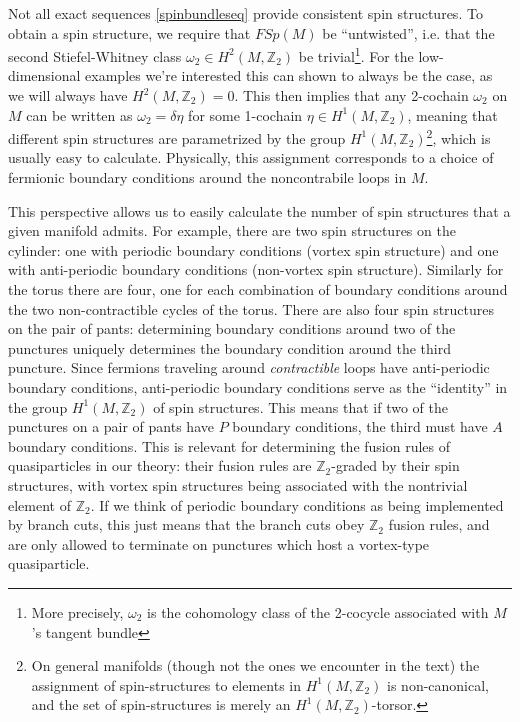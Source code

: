 \documentclass[12pt,a4paper]{article}
\newcommand{\zt}{\mathbb{Z}_2}
\begin{document}
Not all exact sequences \eqref{spinbundleseq} provide consistent spin structures. To obtain a spin structure, we require that $FSp(M)$ be ``untwisted'', i.e. 
that the second Stiefel-Whitney class $\omega_2 \in H^2(M,\zt)$ be trivial\footnote{More precisely, $\omega_2$ is the cohomology class of the 2-cocycle associated with $M$'s tangent bundle}. For the low-dimensional examples we're interested this can shown to always be the case, as we will always have $H^2(M,\zt) = 0$. This then implies that any 2-cochain $\omega_2$ on $M$ can be written as $\omega_2 = \delta \eta$ for some 1-cochain $\eta \in H^1(M,\zt)$, meaning that different spin structures are parametrized by the group $H^1(M,\zt)$\footnote{On general manifolds (though not the ones we encounter in the text) the assignment of spin-structures to elements in $H^1(M,\zt)$ is non-canonical, and the set of spin-structures is merely an $H^1(M,\zt)$-torsor.}, which is usually easy to calculate. Physically, this assignment corresponds to a choice of fermionic boundary conditions around the noncontrabile loops in $M$. 

This perspective allows us to easily calculate the number of spin structures that a given manifold admits. For example, there are two spin structures on the cylinder: one with periodic boundary conditions (vortex spin structure) and one with anti-periodic boundary conditions (non-vortex spin structure). Similarly for the torus there are four, one for each combination of boundary conditions around the two non-contractible cycles of the torus. There are also four spin structures on the pair of pants: determining boundary conditions around two of the punctures uniquely determines the boundary condition around the third puncture. Since fermions traveling around {\it contractible} loops have anti-periodic boundary conditions, anti-periodic boundary conditions serve as the ``identity'' in the group $H^1(M,\zt)$ of spin structures. This means that if two of the punctures on a pair of pants have $P$ boundary conditions, the third must have $A$ boundary conditions. This is relevant for determining the fusion rules of quasiparticles in our theory: their fusion rules are $\zt$-graded by their spin structures, with vortex spin structures being associated with the nontrivial element of $\zt$. If we think of periodic boundary conditions as being implemented by branch cuts, this just means that the branch cuts obey $\zt$ fusion rules, and are only allowed to terminate on punctures which host a vortex-type quasiparticle. 
\end{document}
